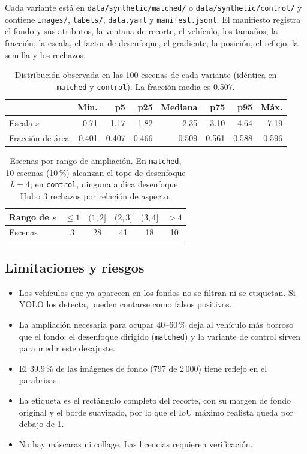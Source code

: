 \documentclass[11pt,a4paper]{article}
\begin{document}
Cada variante est\'a en \texttt{data/synthetic/matched/} o \texttt{data/synthetic/control/}
y contiene \texttt{images/}, \texttt{labels/}, \texttt{data.yaml} y
\texttt{manifest.jsonl}. El manifiesto registra el fondo y sus atributos, la ventana de
recorte, el veh\'iculo, los tama\~nos, la fracci\'on, la escala, el factor de desenfoque,
el gradiente, la posici\'on, el reflejo, la semilla y los rechazos.

\begin{table}[ht]
\centering
\begin{tabular}{@{}lrrrrrrr@{}}
\toprule
 & M\'in. & p5 & p25 & Mediana & p75 & p95 & M\'ax. \\
\midrule
Escala $s$ & 0.71 & 1.17 & 1.82 & 2.35 & 3.10 & 4.64 & 7.19 \\
Fracci\'on de \'area & 0.401 & 0.407 & 0.466 & 0.509 & 0.561 & 0.588 & 0.596 \\
\bottomrule
\end{tabular}
\caption{Distribuci\'on observada en las 100 escenas de cada variante (id\'entica en
\texttt{matched} y \texttt{control}). La fracci\'on media es 0.507.}
\end{table}

\begin{table}[ht]
\centering
\begin{tabular}{@{}lccccc@{}}
\toprule
Rango de $s$ & $\leq 1$ & $(1,2]$ & $(2,3]$ & $(3,4]$ & $>4$ \\
\midrule
Escenas & 3 & 28 & 41 & 18 & 10 \\
\bottomrule
\end{tabular}
\caption{Escenas por rango de ampliaci\'on. En \texttt{matched}, 10 escenas (10\,\%)
alcanzan el tope de desenfoque $b=4$; en \texttt{control}, ninguna aplica desenfoque. Hubo
3 rechazos por relaci\'on de aspecto.}
\end{table}

\subsection{Limitaciones y riesgos}
\begin{itemize}[noitemsep]
  \item Los veh\'iculos que ya aparecen en los fondos no se filtran ni se etiquetan. Si YOLO
        los detecta, pueden contarse como falsos positivos.
  \item La ampliaci\'on necesaria para ocupar 40--60\,\% deja al veh\'iculo m\'as borroso que
        el fondo; el desenfoque dirigido (\texttt{matched}) y la variante de control sirven
        para medir este desajuste.
  \item El 39.9\,\% de las im\'agenes de fondo (797 de 2\,000) tiene reflejo en el parabrisas.
  \item La etiqueta es el rect\'angulo completo del recorte, con su margen de fondo original
        y el borde suavizado, por lo que el IoU m\'aximo realista queda por debajo de 1.
  \item No hay m\'ascaras ni collage. Las licencias requieren verificaci\'on.
\end{itemize}
\end{document}
